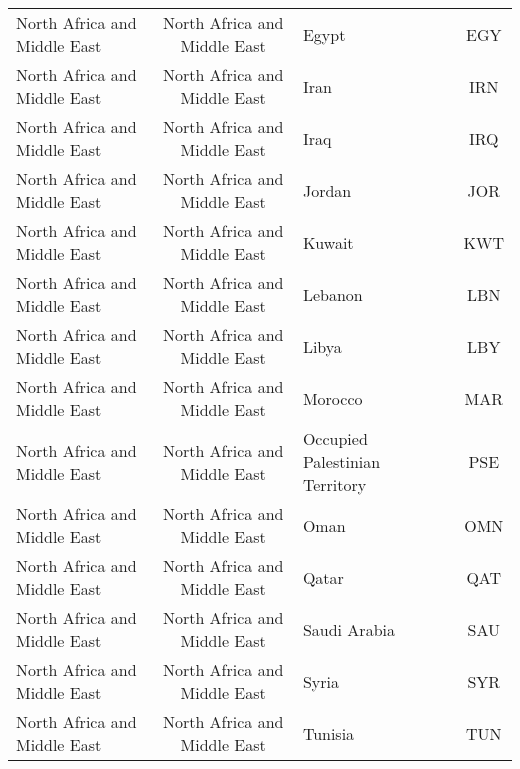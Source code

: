 \begin{landscape}
\begin{longtable}{|p{6cm}|c|p{5cm}|c|}
                     North Africa and Middle East &   North Africa and Middle East &                                             Egypt &  EGY \\
                     North Africa and Middle East &   North Africa and Middle East &                                              Iran &  IRN \\
                     North Africa and Middle East &   North Africa and Middle East &                                              Iraq &  IRQ \\
                     North Africa and Middle East &   North Africa and Middle East &                                            Jordan &  JOR \\
                     North Africa and Middle East &   North Africa and Middle East &                                            Kuwait &  KWT \\
                     North Africa and Middle East &   North Africa and Middle East &                                           Lebanon &  LBN \\
                     North Africa and Middle East &   North Africa and Middle East &                                             Libya &  LBY \\
                     North Africa and Middle East &   North Africa and Middle East &                                           Morocco &  MAR \\
                     North Africa and Middle East &   North Africa and Middle East &      \raggedright              Occupied Palestinian Territory &  PSE \\
                     North Africa and Middle East &   North Africa and Middle East &                                              Oman &  OMN \\
                     North Africa and Middle East &   North Africa and Middle East &                                             Qatar &  QAT \\
                     North Africa and Middle East &   North Africa and Middle East &                                      Saudi Arabia &  SAU \\
                     North Africa and Middle East &   North Africa and Middle East &                                             Syria &  SYR \\
                     North Africa and Middle East &   North Africa and Middle East &                                           Tunisia &  TUN \\

\end{longtable}
\end{landscape}
